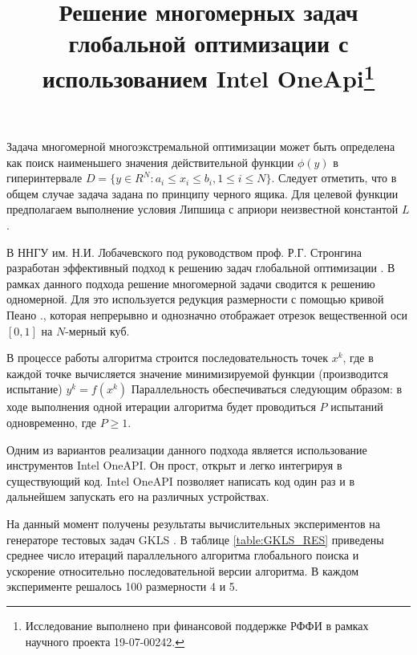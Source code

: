 \documentclass[11pt, oneside, a4paper]{article}
\begin{document}

\title{Решение многомерных задач глобальной оптимизации с использованием Intel OneApi\footnote{Исследование выполнено при финансовой поддержке РФФИ в рамках научного проекта 19-07-00242.}}



Задача многомерной многоэкстремальной оптимизации может быть определена как поиск наименьшего значения действительной функции \(\phi(y)\)  в гиперинтервале \(D=\{y\in R^N:a_i\leqslant x_i\leqslant{b_i}, 1\leqslant{i}\leqslant{N}\}\). 
Следует отметить, что в общем случае задача задана по принципу черного ящика. Для целевой функции предполагаем выполнение условия Липшица с априори неизвестной константой \(L\).

В ННГУ им. Н.И. Лобачевского под руководством проф. Р.Г. Стронгина разработан эффективный подход к решению задач глобальной оптимизации \cite{Strongin2013}. В рамках данного подхода решение многомерной задачи сводится к решению одномерной. Для это используется редукция размерности с помощью кривой Пеано \cite{Sergeyev2013}., которая непрерывно и однозначно отображает отрезок вещественной оси \([0,1]\) на  \(N\)-мерный куб.


В процессе работы алгоритма строится последовательность точек \(x^k\), где в каждой точке вычисляется значение минимизируемой функции (производится испытание) \(y^k=f(x^k)\)  Параллельность обеспечиваться следующим образом: в ходе выполнения одной итерации алгоритма будет проводиться \(P\) испытаний одновременно, где \(P \geq 1\).

Одним из вариантов реализации данного подхода является использование инструментов Intel OneAPI. Он прост, открыт и легко интегрируя в существующий код. Intel OneAPI позволяет написать код один раз и в дальнейшем запускать его на различных устройствах. 


На данный момент получены результаты вычислительных экспериментов на генераторе тестовых задач GKLS \cite{GKLS}. В таблице \ref{table:GKLS_RES} приведены среднее число итераций параллельного алгоритма глобального поиска и ускорение относительно последовательной версии алгоритма. В каждом эксперименте решалось 100 размерности 4 и 5.
\end{document}
